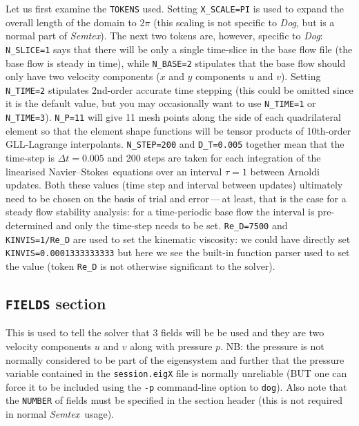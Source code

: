 \documentclass[11pt,a4paper]{report}
\newcommand\NavSto{Navier--Stokes}
\newcommand{\Semtex}{\emph{Semtex}}
\newcommand{\Dog}{\emph{Dog}}
\begin{document}
Let us first examine the \verb+TOKENS+ used.  Setting
\verb+X_SCALE=PI+ is used to expand the overall length of the domain
to $2\pi$ (this scaling is not specific to \Dog, but is a normal part
of \Semtex).  
%
The next two tokens are, however, specific to \Dog: \verb+N_SLICE=1+
says that there will be only a single time-slice in the base flow file
(the base flow is steady in time), while \verb+N_BASE=2+ stipulates
that the base flow should only have two velocity components ($x$ and
$y$ components $u$ and $v$).
%
Setting \verb+N_TIME=2+ stipulates 2nd-order accurate time stepping
(this could be omitted since it is the default value, but you may
occasionally want to use \verb+N_TIME=1+ or
\verb+N_TIME=3+). \verb+N_P=11+ will give 11 mesh points along the
side of each quadrilateral element so that the element shape functions
will be tensor products of 10th-order GLL-Lagrange interpolants.
%
\verb+N_STEP=200+ and \verb+D_T=0.005+ together mean that the
time-step is $\Delta t=0.005$ and 200 steps are taken for each
integration of the linearised \NavSto\ equations over an interval
$\tau=1$ between Arnoldi updates.  Both these values (time step
and interval between updates) ultimately need to be chosen on the
basis of trial and error\,---\,at least, that is the case for a steady
flow stability analysis: for a time-periodic base flow the interval is
pre-determined and only the time-step needs to be set.
%
\verb+Re_D=7500+ and \verb+KINVIS=1/Re_D+ are used to set the
kinematic viscosity: we could have directly set
\verb+KINVIS=0.0001333333333+ but here we see the built-in function
parser used to set the value (token \verb+Re_D+ is not otherwise
significant to the solver).

\subsection{\texttt{FIELDS} section}

This is used to tell the solver that 3 fields will be be used and they
are two velocity components $u$ and $v$ along with pressure $p$.  NB:
the pressure is not normally considered to be part of the eigensystem
and further that the pressure variable contained in the
\verb+session.eigX+ file is normally unreliable (BUT one can force it
to be included using the \verb+-p+ command-line option to
\verb+dog+). Also note that the \verb+NUMBER+ of fields must be
specified in the section header (this is not required in normal
\Semtex\ usage).
\end{document}

